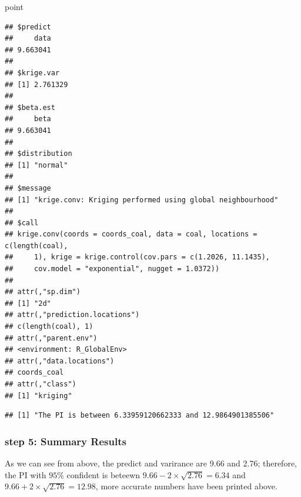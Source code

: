 \documentclass[]{article}
\newenvironment{Shaded}{\begin{snugshade}}{\end{snugshade}}
\newcommand{\KeywordTok}[1]{\textcolor[rgb]{0.13,0.29,0.53}{\textbf{#1}}}
\newcommand{\DecValTok}[1]{\textcolor[rgb]{0.00,0.00,0.81}{#1}}
\newcommand{\StringTok}[1]{\textcolor[rgb]{0.31,0.60,0.02}{#1}}
\newcommand{\OperatorTok}[1]{\textcolor[rgb]{0.81,0.36,0.00}{\textbf{#1}}}
\newcommand{\NormalTok}[1]{#1}
\begin{document}
\begin{Shaded}
\begin{Highlighting}[]
\NormalTok{point}
\end{Highlighting}
\end{Shaded}

\begin{verbatim}
## $predict
##     data 
## 9.663041 
## 
## $krige.var
## [1] 2.761329
## 
## $beta.est
##     beta 
## 9.663041 
## 
## $distribution
## [1] "normal"
## 
## $message
## [1] "krige.conv: Kriging performed using global neighbourhood"
## 
## $call
## krige.conv(coords = coords_coal, data = coal, locations = c(length(coal), 
##     1), krige = krige.control(cov.pars = c(1.2026, 11.1435), 
##     cov.model = "exponential", nugget = 1.0372))
## 
## attr(,"sp.dim")
## [1] "2d"
## attr(,"prediction.locations")
## c(length(coal), 1)
## attr(,"parent.env")
## <environment: R_GlobalEnv>
## attr(,"data.locations")
## coords_coal
## attr(,"class")
## [1] "kriging"
\end{verbatim}

\begin{Shaded}
\end{Shaded}

\begin{verbatim}
## [1] "The PI is between 6.33959120662333 and 12.9864901385506"
\end{verbatim}

\subsubsection{step 5: Summary Results}\label{step-5-summary-results-1}

As we can see from above, the predict and varirance are 9.66 and 2.76;
therefore, the PI with \(95\%\) confident is beteewn
\(9.66-2\times\sqrt{2.76}= 6.34\) and \(9.66+2\times\sqrt{2.76}=12.98\),
more accurate numbers have been printed above.
\end{document}
